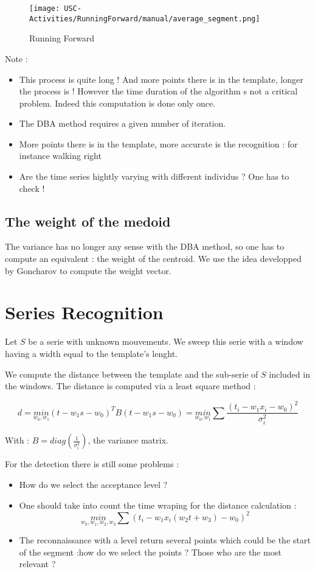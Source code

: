 \documentclass[a4,12pt]{article}
\begin{document}
	\begin{figure}[H]
		\centering
		\texttt{[image: USC-Activities/RunningForward/manual/average\_segment.png]}
		\caption{Running Forward}
		\label{RunningForwardAverage}
	\end{figure}	
	
	Note :
	\begin{itemize}
		\item This process is quite long ! And more points there is in the template, longer the process is ! However the time duration of the algorithm s not a critical problem. Indeed this computation is done only once.
		\item The DBA method requires a given number of iteration.
		\item More points there is in the template, more accurate is the recognition : for instance walking right
		\item Are the time series hightly varying with different individus ? One has to check !
	\end{itemize}
	
	\subsection{The weight of the medoid}
	
	The variance has no longer any sense with the DBA method, so one has to compute an equivalent : the weight of the centroid. We use the idea developped by Goncharov\cite{goncharov} to compute the weight vector. 

	
	\section{Series Recognition}
	
	Let $S$ be a serie with unknown mouvements. We sweep this serie with a window having a width equal to the template's lenght.
	
	We compute the distance between the template and the sub-serie of $S$ included in the windows.
	The distance is computed via a least square method :
	
	\[ d = \underset{w_0,w_1}{min} (t - w_1 s - w_0)^T B (t - w_1 s - w_0) = \underset{w_0,w_1}{min} \sum \frac{(t_i - w_1 x_i - w_0)^2}{\sigma_i^2} \]
	
	With : $B=diag(\frac{1}{\sigma_i^2})$, the variance matrix.
	
	
	For the detection there is still some problems :
	\begin{itemize}
		\item How do we select the acceptance level ?
		\item One should take into count the time wraping for the distance calculation : \[ \underset{w_0,w_1, w_2, w_3}{min} \sum (t_i - w_1 x_i(w_2 t + w_3) - w_0)^2 \]
		\item The reconnaissance with a level return several points which could be the start of the segment :how do we select the points ? Those who are the most relevant ?
	\end{itemize}
	
\end{document}
